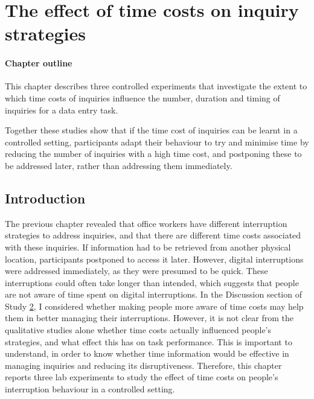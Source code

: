 \chapter{The effect of time costs on inquiry strategies}\label{ch:34}

\begin{mynote}
\subsubsection{Chapter outline}
This chapter describes three controlled experiments that investigate the extent to which time costs of inquiries influence the number, duration and timing of inquiries for a data entry task. 


Together these studies show that if the time cost of inquiries can be learnt in a controlled setting, participants adapt their behaviour to try and minimise time by reducing the number of inquiries with a high time cost, and postponing these to be addressed later, rather than addressing them immediately. 

\end{mynote}
 
 \section{Introduction}
The previous chapter revealed that office workers have different interruption strategies to address inquiries, and that there are different time costs associated with these inquiries. If information had to be retrieved from another physical location, participants postponed to access it later. However, digital interruptions were addressed immediately, as they were presumed to be quick. These interruptions could often take longer than intended, which suggests that people are not aware of time spent on digital interruptions. In the Discussion section of Study \hyperref[st:Study2]{2}, I considered whether making people more aware of time costs may help them in better managing their interruptions. However, it is not clear from the qualitative studies alone whether time costs actually influenced people's strategies, and what effect this has on task performance. This is important to understand, in order to know whether time information would be effective in managing inquiries and reducing its disruptiveness. Therefore, this chapter reports three lab experiments to study the effect of time costs on people's interruption behaviour in a controlled setting.

